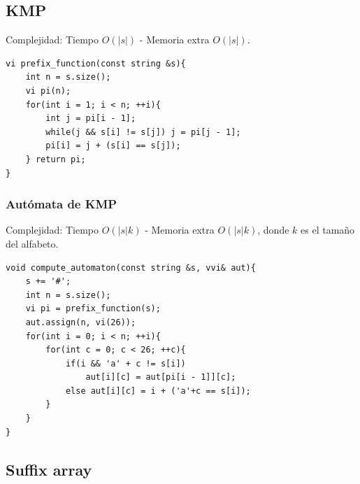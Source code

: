 \documentclass[12 pts,spanish,mexico]{article}
\numberwithin{equation}{section}
\begin{document}
\begin{multicols}{2}
\subsection{KMP}
Complejidad: Tiempo $O(|s|)$ - Memoria extra $O(|s|)$.
\begin{verbatim}
vi prefix_function(const string &s){
    int n = s.size();
    vi pi(n);
    for(int i = 1; i < n; ++i){
        int j = pi[i - 1];
        while(j && s[i] != s[j]) j = pi[j - 1];
        pi[i] = j + (s[i] == s[j]);
    } return pi;
}
\end{verbatim}

\subsubsection{Autómata de KMP}
Complejidad: Tiempo $O(|s|k)$ - Memoria extra $O(|s|k)$, donde $k$ es el tamaño del alfabeto.
\begin{verbatim}
void compute_automaton(const string &s, vvi& aut){
    s += '#';
    int n = s.size();
    vi pi = prefix_function(s);
    aut.assign(n, vi(26));
    for(int i = 0; i < n; ++i){
        for(int c = 0; c < 26; ++c){
            if(i && 'a' + c != s[i])
                aut[i][c] = aut[pi[i - 1]][c];
            else aut[i][c] = i + ('a'+c == s[i]);
        }
    }
}
\end{verbatim}

\subsection{Suffix array}

\end{multicols}
\end{document}

